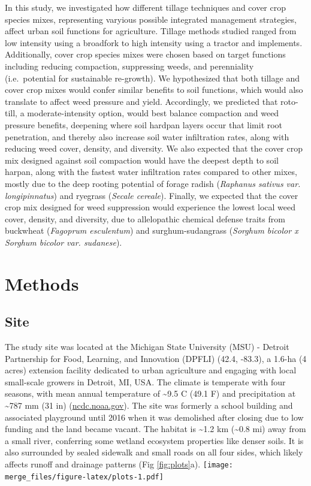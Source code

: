 \documentclass[
  12pt,
]{article}
\begin{document}
In this study, we investigated how different tillage techniques and cover crop species mixes, representing varyious possible integrated management strategies, affect urban soil functions for agriculture.
Tillage methods studied ranged from low intensity using a broadfork to high intensity using a tractor and implements.
Additionally, cover crop species mixes were chosen based on target functions including reducing compaction, suppressing weeds, and perenniality (i.e.~potential for sustainable re-growth).
We hypothesized that both tillage and cover crop mixes would confer similar benefits to soil functions, which would also translate to affect weed pressure and yield.
Accordingly, we predicted that roto-till, a moderate-intensity option, would best balance compaction and weed pressure benefits, deepening where soil hardpan layers occur that limit root penetration, and thereby also increase soil water infiltration rates, along with reducing weed cover, density, and diversity.
We also expected that the cover crop mix designed against soil compaction would have the deepest depth to soil harpan, along with the fastest water infiltration rates compared to other mixes, mostly due to the deep rooting potential of forage radish (\emph{Raphanus sativus var. longipinnatus}) and ryegrass (\emph{Secale cereale}).
Finally, we expected that the cover crop mix designed for weed suppression would experience the lowest local weed cover, density, and diversity, due to allelopathic chemical defense traits from buckwheat (\emph{Fagoprum esculentum}) and surghum-sudangrass (\emph{Sorghum bicolor x Sorghum bicolor var. sudanese}).

\hypertarget{methods}{%
\section{Methods}\label{methods}}

\hypertarget{site}{%
\subsection{Site}\label{site}}

The study site was located at the Michigan State University (MSU) - Detroit Partnership for Food, Learning, and Innovation (DPFLI) (42.4, -83.3), a 1.6-ha (4 acres) extension facility dedicated to urban agriculture and engaging with local small-scale growers in Detroit, MI, USA.
The climate is temperate with four seasons, with mean annual temperature of \textasciitilde9.5 C (49.1 F) and precipitation at \textasciitilde787 mm (31 in) (\url{ncdc.noaa.gov}).
The site was formerly a school building and associated playground until 2016 when it was demolished after closing due to low funding and the land became vacant.
The habitat is \textasciitilde1.2 km (\textasciitilde0.8 mi) away from a small river, conferring some wetland ecosystem properties like denser soils.
It is also surrounded by sealed sidewalk and small roads on all four sides, which likely affects runoff and drainage patterns (Fig \ref{fig:plots}a).
\texttt{[image: merge\_files/figure-latex/plots-1.pdf]}
\end{document}
